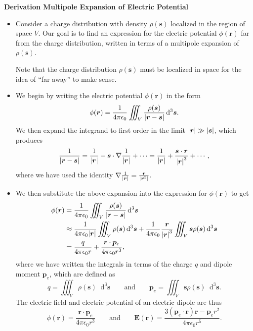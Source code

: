 \documentclass[11pt, a4paper]{article}
\newcommand{\diff}{\mathop{}\!\mathrm{d}} %
\newcommand{\eqtext}[1]{\qquad \text{#1} \qquad}
\renewcommand{\vec}[1]{\bm{#1}} %
\renewcommand{\r}{\vec{r}}
\newcommand{\E}{\vec{E}} %
\newcommand{\ee}{\epsilon_{0}}  %
\newcommand{\pe}{\vec{p}_{e}}  %
\newcommand{\s}{\vec{s}}  %
\newcommand{\ds}{\diff^{3} \s}  %
\renewcommand{\grad}{\nabla}
\begin{document}
\textbf{Derivation Multipole Expansion of Electric Potential}
\begin{itemize}
	\item Consider a charge distribution with density $ \rho(\s) $ localized in the region of space $ V $. Our goal is to find an expression for the electric potential $ \phi(\r) $ far from the charge distribution, written in terms of a multipole expansion of $ \rho(\s) $.
	
    Note that the charge distribution $ \rho(\s) $ must be localized in space for the idea of ``far away'' to make sense.

    \item We begin by writing the electric potential $ \phi(\r) $ in the form
	\begin{equation*}
		\phi(\r) = \frac{1}{4\pi \ee}\iiint_{V}\frac{\rho(\s)}{\abs{\r - \s}} \ds.
	\end{equation*}
    We then expand the integrand to first order in the limit $ \abs{\r} \gg \abs{\s}  $, which produces
	\begin{equation*}
        \frac{1}{\abs{\r - \s}} = \frac{1}{\abs{\r}} - \s \cdot \grad \frac{1}{\abs{\r}} + \cdots = \frac{1}{\abs{\r}} + \frac{\s \cdot \r}{\abs{\r}^{3}} + \cdots,
	\end{equation*}
    where we have used the identity $ \grad \frac{1}{\abs{\r}} = \frac{\r}{\abs{\r^{3}}} $.

    \item We then substitute the above expansion into the expression for $ \phi(\r) $ to get
	\begin{align*}
		\phi(\r) &= \frac{1}{4\pi \ee}\iiint_{V}\frac{\rho(\s)}{\abs{\r - \s}} \ds \\
        & \approx \frac{1}{4\pi \ee \abs{\r}}\iiint_{V} \rho(\s) \ds + \frac{1}{4\pi \ee}\frac{\r}{\abs{\r}^{3}}\iiint_{V} \s \rho(\s)\ds\\
		& = \frac{q}{4\pi \ee r} + \frac{\r \cdot \pe}{4\pi \ee r^{3}},
	\end{align*}
    where we have written the integrals in terms of the charge $ q $ and dipole moment $ \pe $, which are defined as
	\begin{equation*}
		q = \iiint_{V} \rho(\s) \ds \eqtext{and} \pe = \iiint_{V} \s \rho(\s) \ds.
	\end{equation*}
    The electric field and electric potential of an electric dipole are thus
    \begin{equation*}
        \phi(\r) = \frac{\r \cdot \pe}{4\pi \ee r^{3}} \qquad \text{and} \qquad \E(\r) = \frac{3 (\pe \cdot \r) \r - \pe r^{2}}{4 \pi \ee r^{5}}.
    \end{equation*}
    

\end{itemize}
\end{document}
